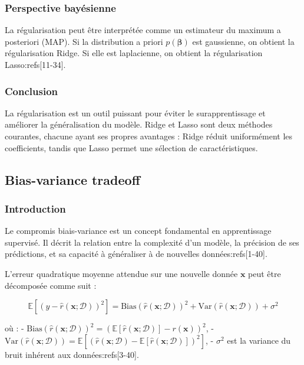 \documentclass[10pt,a4paper]{article}
\begin{document}
\subsubsection*{Perspective bayésienne}

La régularisation peut être interprétée comme un estimateur du maximum a posteriori (MAP). Si la distribution a priori $p(\boldsymbol{\beta})$ est gaussienne, on obtient la régularisation Ridge. Si elle est laplacienne, on obtient la régularisation Lasso:refs[11-34].

\subsubsection*{Conclusion}

La régularisation est un outil puissant pour éviter le surapprentissage et améliorer la généralisation du modèle. Ridge et Lasso sont deux méthodes courantes, chacune ayant ses propres avantages : Ridge réduit uniformément les coefficients, tandis que Lasso permet une sélection de caractéristiques.

\subsection*{Bias-variance tradeoff}

\subsubsection*{Introduction}

Le compromis biais-variance est un concept fondamental en apprentissage supervisé. Il décrit la relation entre la complexité d'un modèle, la précision de ses prédictions, et sa capacité à généraliser à de nouvelles données:refs[1-40].

L'erreur quadratique moyenne attendue sur une nouvelle donnée $\mathbf{x}$ peut être décomposée comme suit :

$$
\mathbb{E}\left[(y - \hat{r}(\mathbf{x}; \mathcal{D}))^{2}\right] = \text{Bias}(\hat{r}(\mathbf{x}; \mathcal{D}))^{2} + \text{Var}(\hat{r}(\mathbf{x}; \mathcal{D})) + \sigma^{2}
$$

où :
- $\text{Bias}(\hat{r}(\mathbf{x}; \mathcal{D}))^{2} = (\mathbb{E}[\hat{r}(\mathbf{x}; \mathcal{D})] - r(\mathbf{x}))^2$,
- $\text{Var}(\hat{r}(\mathbf{x}; \mathcal{D})) = \mathbb{E}[(\hat{r}(\mathbf{x}; \mathcal{D}) - \mathbb{E}[\hat{r}(\mathbf{x}; \mathcal{D})])^2]$,
- $\sigma^2$ est la variance du bruit inhérent aux données:refs[3-40].
\end{document}

